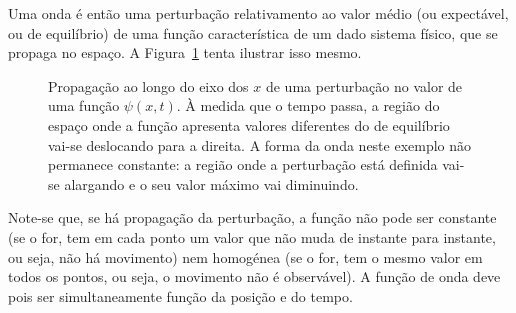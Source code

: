 Uma onda é então uma perturbação relativamento ao valor médio (ou expectável, ou
de equilíbrio) de uma função característica de um dado sistema físico, que se
propaga no espaço. A Figura~\ref{fig:20-030} tenta ilustrar isso mesmo.
\begin{figure}[htb]
    {\centering
        \par
    }
    \caption{Propagação ao longo do eixo dos $x$ de uma perturbação no valor de
    uma função $\psi(x,t)$. À medida que o tempo passa, a região do espaço onde
    a função apresenta valores diferentes do de equilíbrio vai-se deslocando
    para a direita. A forma da onda neste exemplo não permanece
    constante: a região onde a perturbação está definida vai-se alargando e o
    seu valor máximo vai diminuindo.\label{fig:20-030}}
\end{figure}
Note-se que, se há propagação da perturbação, a função não pode ser constante
(se o for, tem em cada ponto um valor que não muda de instante para instante, ou
seja, não há movimento) nem homogénea (se o for, tem o mesmo valor em todos os
pontos, ou seja, o movimento não é observável). A função de onda deve pois ser
simultaneamente função da posição e do tempo.

